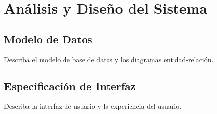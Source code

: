 	\chapter{Análisis y Diseño del Sistema}	
	
	\section{Modelo de Datos}
	Describa el modelo de base de datos y los diagramas entidad-relación.
	
	\section{Especificación de Interfaz}
	Describa la interfaz de usuario y la experiencia del usuario.
	
